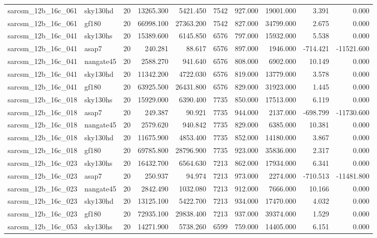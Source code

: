 \documentclass{article}
\begin{document}
\begin{longtable}{llrrrrrrrr}
sarcsm\_12b\_16c\_061 & sky130hd & 20 & 13265.300 & 5421.450 & 7542 & 927.000 & 19001.000 & 3.391 & 0.000 \\
sarcsm\_12b\_16c\_061 & gf180 & 20 & 66998.100 & 27363.200 & 7542 & 827.000 & 34799.000 & 2.675 & 0.000 \\
sarcsm\_12b\_16c\_041 & sky130hs & 20 & 15389.600 & 6145.850 & 6576 & 797.000 & 15932.000 & 5.538 & 0.000 \\
sarcsm\_12b\_16c\_041 & asap7 & 20 & 240.281 & 88.617 & 6576 & 897.000 & 1946.000 & -714.421 & -11521.600 \\
sarcsm\_12b\_16c\_041 & nangate45 & 20 & 2588.270 & 941.640 & 6576 & 808.000 & 6902.000 & 10.149 & 0.000 \\
sarcsm\_12b\_16c\_041 & sky130hd & 20 & 11342.200 & 4722.030 & 6576 & 819.000 & 13779.000 & 3.578 & 0.000 \\
sarcsm\_12b\_16c\_041 & gf180 & 20 & 63925.500 & 26431.800 & 6576 & 829.000 & 31923.000 & 1.445 & 0.000 \\
sarcsm\_12b\_16c\_018 & sky130hs & 20 & 15929.000 & 6390.400 & 7735 & 850.000 & 17513.000 & 6.119 & 0.000 \\
sarcsm\_12b\_16c\_018 & asap7 & 20 & 249.387 & 90.921 & 7735 & 944.000 & 2137.000 & -698.799 & -11730.600 \\
sarcsm\_12b\_16c\_018 & nangate45 & 20 & 2579.620 & 940.842 & 7735 & 829.000 & 6385.000 & 10.381 & 0.000 \\
sarcsm\_12b\_16c\_018 & sky130hd & 20 & 11675.900 & 4853.400 & 7735 & 852.000 & 14180.000 & 3.867 & 0.000 \\
sarcsm\_12b\_16c\_018 & gf180 & 20 & 69785.800 & 28796.900 & 7735 & 923.000 & 35836.000 & 2.317 & 0.000 \\
sarcsm\_12b\_16c\_023 & sky130hs & 20 & 16432.700 & 6564.630 & 7213 & 862.000 & 17934.000 & 6.341 & 0.000 \\
sarcsm\_12b\_16c\_023 & asap7 & 20 & 250.937 & 94.974 & 7213 & 973.000 & 2274.000 & -710.513 & -11481.800 \\
sarcsm\_12b\_16c\_023 & nangate45 & 20 & 2842.490 & 1032.080 & 7213 & 912.000 & 7666.000 & 10.166 & 0.000 \\
sarcsm\_12b\_16c\_023 & sky130hd & 20 & 13125.100 & 5422.700 & 7213 & 934.000 & 17470.000 & 4.032 & 0.000 \\
sarcsm\_12b\_16c\_023 & gf180 & 20 & 72935.100 & 29838.400 & 7213 & 937.000 & 39374.000 & 1.529 & 0.000 \\
sarcsm\_12b\_16c\_053 & sky130hs & 20 & 14271.900 & 5738.260 & 6599 & 759.000 & 14405.000 & 6.151 & 0.000 \\

\end{longtable}
\end{document}
